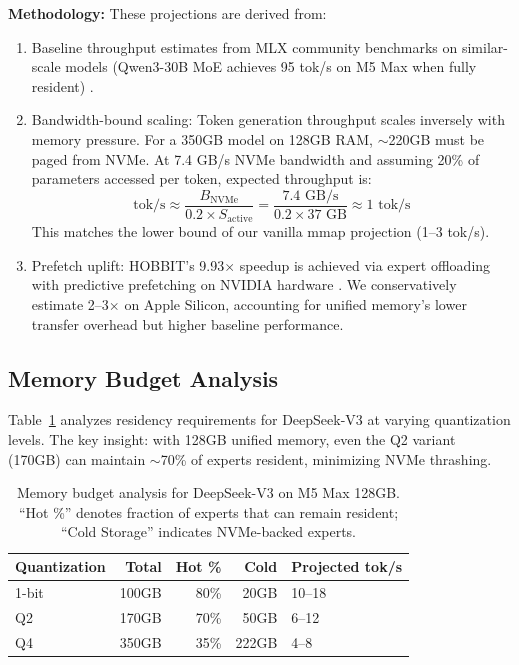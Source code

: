 \documentclass[11pt]{article}
\begin{document}
\textbf{Methodology:} These projections are derived from:
\begin{enumerate}
    \item Baseline throughput estimates from MLX community benchmarks on similar-scale models (Qwen3-30B MoE achieves 95 tok/s on M5 Max when fully resident) \cite{mlx2026}.
    \item Bandwidth-bound scaling: Token generation throughput scales inversely with memory pressure. For a 350GB model on 128GB RAM, $\sim$220GB must be paged from NVMe. At 7.4 GB/s NVMe bandwidth and assuming 20\% of parameters accessed per token, expected throughput is:
    \[
        \text{tok/s} \approx \frac{B_{\text{NVMe}}}{0.2 \times S_{\text{active}}} = \frac{7.4 \text{ GB/s}}{0.2 \times 37 \text{ GB}} \approx 1 \text{ tok/s}
    \]
    This matches the lower bound of our vanilla mmap projection (1--3 tok/s).
    \item Prefetch uplift: HOBBIT's 9.93$\times$ speedup is achieved via expert offloading with predictive prefetching on NVIDIA hardware \cite{hobbit2024}. We conservatively estimate 2--3$\times$ on Apple Silicon, accounting for unified memory's lower transfer overhead but higher baseline performance.
\end{enumerate}

\subsection{Memory Budget Analysis}

Table~\ref{tab:memory} analyzes residency requirements for DeepSeek-V3 at varying quantization levels. The key insight: with 128GB unified memory, even the Q2 variant (170GB) can maintain $\sim$70\% of experts resident, minimizing NVMe thrashing.

\begin{table}[t]
\centering
\caption{Memory budget analysis for DeepSeek-V3 on M5 Max 128GB. ``Hot \%'' denotes fraction of experts that can remain resident; ``Cold Storage'' indicates NVMe-backed experts.}
\label{tab:memory}
\begin{tabular}{lrrrl}
\toprule
\textbf{Quantization} & \textbf{Total} & \textbf{Hot \%} & \textbf{Cold} & \textbf{Projected tok/s} \\
\midrule
1-bit & 100GB & 80\% & 20GB & 10--18 \\
Q2 & 170GB & 70\% & 50GB & 6--12 \\
Q4 & 350GB & 35\% & 222GB & 4--8 \\
\bottomrule
\end{tabular}
\end{table}
\end{document}
